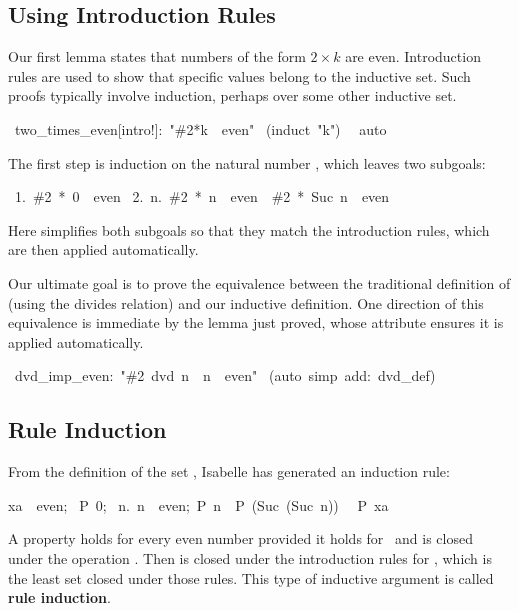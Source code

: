 \subsection{Using Introduction Rules}

Our first lemma states that numbers of the form $2\times k$ are even.
Introduction rules are used to show that specific values belong to the
inductive set.  Such proofs typically involve 
induction, perhaps over some other inductive set.
\begin{isabelle}
\ two_times_even[intro!]:\ "\#2*k\ \isasymin \ even"
\isanewline
{}\ (induct\ "k")\isanewline
\ \ auto\isanewline
{}
\end{isabelle}
%
The first step is induction on the natural number , which leaves
two subgoals:
\begin{isabelle}
\ 1.\ \#2\ *\ 0\ \isasymin \ even\isanewline
\ 2.\ \isasymAnd n.\ \#2\ *\ n\ \isasymin \ even\ \isasymLongrightarrow \ \#2\ *\ Suc\ n\ \isasymin \ even
\end{isabelle}
%
Here  simplifies both subgoals so that they match the introduction
rules, which are then applied automatically.

Our ultimate goal is to prove the equivalence between the traditional
definition of  (using the divides relation) and our inductive
definition.  One direction of this equivalence is immediate by the lemma
just proved, whose  attribute ensures it is applied automatically.
\begin{isabelle}
\ dvd_imp_even:\ "\#2\ dvd\ n\ \isasymLongrightarrow \ n\ \isasymin \ even"\isanewline
{}\ (auto\ simp\ add:\ dvd_def)
\end{isabelle}

\subsection{Rule Induction}
\label{sec:rule-induction}

From the definition of the set
, Isabelle has
generated an induction rule:
\begin{isabelle}
\isasymlbrakk xa\ \isasymin \ even;\isanewline
\ P\ 0;\isanewline
\ \isasymAnd n.\ \isasymlbrakk n\ \isasymin \ even;\ P\ n\isasymrbrakk \
\isasymLongrightarrow \ P\ (Suc\ (Suc\ n))\isasymrbrakk\isanewline
\ \isasymLongrightarrow \ P\ xa%
\end{isabelle}
A property  holds for every even number provided it
holds for~ and is closed under the operation
.  Then  is closed under the introduction
rules for \isa{even}, which is the least set closed under those rules. 
This type of inductive argument is called \textbf{rule induction}. 


